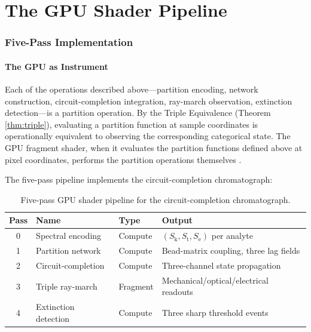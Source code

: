 \documentclass[twocolumn,10pt,a4paper]{article}
\theoremstyle{definition}
\theoremstyle{remark}
\newcommand{\Sk}{S_{\mathrm{k}}}
\newcommand{\St}{S_{\mathrm{t}}}
\newcommand{\Se}{S_{\mathrm{e}}}
\begin{document}
\part{The GPU Shader Pipeline}

\section{Five-Pass Implementation}
\label{sec:gpu}

\subsection{The GPU as Instrument}

Each of the operations described above---partition encoding, network construction, circuit-completion integration, ray-march observation, extinction detection---is a partition operation. By the Triple Equivalence (Theorem \ref{thm:triple}), evaluating a partition function at sample coordinates is operationally equivalent to observing the corresponding categorical state. The GPU fragment shader, when it evaluates the partition functions defined above at pixel coordinates, performs the partition operations themselves \citep{khronos2017,kajiya1986}.

The five-pass pipeline implements the circuit-completion chromatograph:

\begin{table}[H]
\centering
\caption{Five-pass GPU shader pipeline for the circuit-completion chromatograph.}
\label{tab:five_pass}
\small
\begin{tabular}{clll}
\toprule
\textbf{Pass} & \textbf{Name} & \textbf{Type} & \textbf{Output} \\
\midrule
0 & Spectral encoding & Compute & $(\Sk, \St, \Se)$ per analyte \\
1 & Partition network & Compute & Bead-matrix coupling, three lag fields \\
2 & Circuit-completion & Compute & Three-channel state propagation \\
3 & Triple ray-march & Fragment & Mechanical/optical/electrical readouts \\
4 & Extinction detection & Compute & Three sharp threshold events \\
\bottomrule
\end{tabular}
\end{table}
\end{document}
